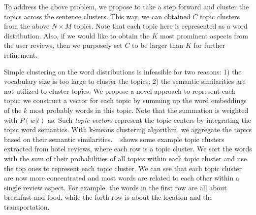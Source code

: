 To address the above problem, we propose to take a step forward and cluster the topics across the sentence clusters.
This way, we can obtained $C$ topic clusters from the above $N\times M$ topics.
Note that each topic here is represented as a word distribution.
Also, if we would like to obtain the $K$  most prominent aspects 
from the user reviews, then we purposely set $C$ to be larger 
than $K$ for further refinement.

Simple clustering on the word distributions is infeasible 
for two reasons: 1) the vocabulary size is too large to cluster the 
topics; 2) the semantic similarities are not utilized to cluster topics.
We propose a novel approach to represent each topic:
we construct a vector for each topic by summing up the word embeddings 
of the $k$ most probably words in this topic.
Note that the summation is weighted with $P(w|t)$ as. 
Such \textit{topic vector}s represent 
the topic centers by integrating the topic word semantics. 
With k-means clustering algorithm, we aggregate the topics based on their semantic similarities.
~ shows some example topic clusters extracted from hotel reviews, where each row is a topic cluster.
We sort the words with the sum of their probabilities of all topics within each topic cluster and use the top ones to represent each topic cluster.
We can see that each topic cluster are now more concentrated and 
most words are related to each other within a single review aspect. 
For example, the words in the first row are all about 
breakfast and food, while the forth row is about the location 
and the transportation.

